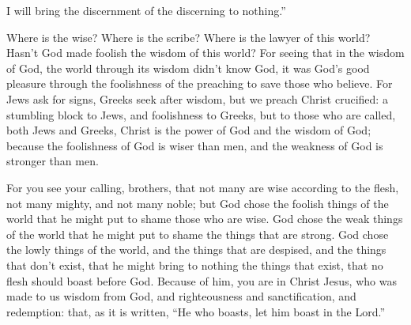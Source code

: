 {\par }{\QB I will bring the discernment of the discerning to nothing.”
\par }{\PP {}Where is the wise? Where is the scribe? Where is the lawyer of this world? Hasn’t God made foolish the wisdom of this world?
For seeing that in the wisdom of God, the world through its wisdom didn’t know God, it was God’s good pleasure through the foolishness of the preaching to save those who believe.
For Jews ask for signs, Greeks seek after wisdom,
but we preach Christ crucified: a stumbling block to Jews, and foolishness to Greeks,
but to those who are called, both Jews and Greeks, Christ is the power of God and the wisdom of God;
because the foolishness of God is wiser than men, and the weakness of God is stronger than men.
\par }{\PP {}For you see your calling, brothers, that not many are wise according to the flesh, not many mighty, and not many noble;
but God chose the foolish things of the world that he might put to shame those who are wise. God chose the weak things of the world that he might put to shame the things that are strong.
God chose the lowly things of the world, and the things that are despised, and the things that don’t exist, that he might bring to nothing the things that exist,
that no flesh should boast before God.
Because of him, you are in Christ Jesus, who was made to us wisdom from God, and righteousness and sanctification, and redemption:
that, as it is written, “He who boasts, let him boast in the Lord.”

}
